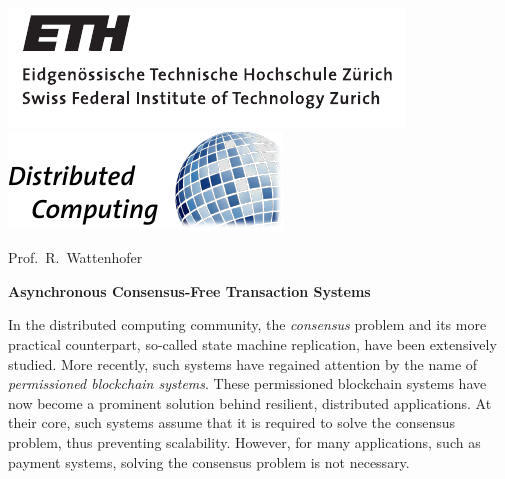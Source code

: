 \documentclass[a4paper,11pt]{article}
\begin{document}
	
\thispagestyle{empty}

\noindent
\hrulefill \vspace{6pt}

\noindent
\includegraphics[viewport=8 8 185 55]{eth_logo_black} \hfill
\includegraphics[trim=0 0 2 0]{disco-logo-col} \hspace{-6pt} \vspace{-6pt}

\noindent \hrulefill \vspace{4pt}

\hfill Prof.\ R.\ Wattenhofer

\vspace{1em}
\vspace{1em}

\noindent \textbf{\LARGE Asynchronous Consensus-Free Transaction Systems} \bigskip


\noindent 

\noindent In the distributed computing community, the \emph{consensus} problem and its more practical counterpart, so-called state machine replication, have been extensively studied. More recently, such systems have regained attention by the name of \emph{permissioned blockchain systems}. These permissioned blockchain systems have now become a prominent solution behind resilient, distributed applications. At their core, such systems assume that it is required to solve the consensus problem, thus preventing scalability. However, for many applications, such as payment systems, solving the consensus problem is not necessary.\\
\end{document}
